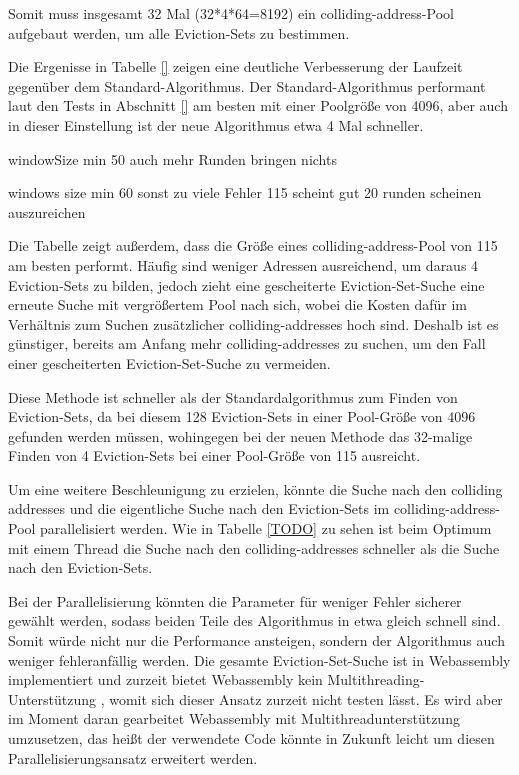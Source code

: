Somit muss insgesamt 32 Mal (32*4*64=8192) ein colliding-address-Pool aufgebaut werden, um alle Eviction-Sets zu bestimmen.



Die Ergenisse in Tabelle \ref{} zeigen eine deutliche Verbesserung der Laufzeit gegenüber dem Standard-Algorithmus.
Der Standard-Algorithmus performant laut den Tests in Abschnitt \ref{} am besten mit einer Poolgröße von 4096, aber auch in dieser Einstellung ist der neue Algorithmus etwa 4 Mal schneller. 

windowSize min 50 auch mehr Runden bringen nichts

windows size min 60 sonst zu viele Fehler
115 scheint gut
20 runden scheinen auszureichen

Die Tabelle zeigt außerdem, dass die Größe eines colliding-address-Pool von 115 am besten performt.
Häufig sind weniger Adressen ausreichend, um daraus 4 Eviction-Sets zu bilden, jedoch zieht eine gescheiterte Eviction-Set-Suche eine erneute Suche mit vergrößertem Pool nach sich, wobei die Kosten dafür im Verhältnis zum Suchen zusätzlicher colliding-addresses hoch sind.
Deshalb ist es günstiger, bereits am Anfang mehr colliding-addresses zu suchen, um den Fall einer gescheiterten Eviction-Set-Suche zu vermeiden.


Diese Methode ist schneller als der Standardalgorithmus zum Finden von Eviction-Sets, da bei diesem 128 Eviction-Sets in einer Pool-Größe von 4096 gefunden werden müssen, wohingegen bei der neuen Methode das 32-malige Finden von 4 Eviction-Sets bei einer Pool-Größe von 115 ausreicht.

Um eine weitere Beschleunigung zu erzielen, könnte die Suche nach den colliding addresses und die eigentliche Suche nach den Eviction-Sets im colliding-address-Pool parallelisiert werden. Wie in Tabelle \ref{TODO} zu sehen ist beim Optimum mit einem Thread die Suche nach den colliding-addresses schneller als die Suche nach den Eviction-Sets.

Bei der Parallelisierung könnten die Parameter für weniger Fehler sicherer gewählt werden, sodass beiden Teile des Algorithmus in etwa gleich schnell sind.
Somit würde nicht nur die Performance ansteigen, sondern der Algorithmus auch weniger fehleranfällig werden.
Die gesamte Eviction-Set-Suche ist in Webassembly implementiert und zurzeit bietet Webassembly kein Multithreading-Unterstützung \cite{WebassemblyThreads}, womit sich dieser Ansatz zurzeit nicht testen lässt.
Es wird aber im Moment daran gearbeitet Webassembly mit Multithreadunterstützung umzusetzen, das heißt der verwendete Code könnte in Zukunft leicht um diesen Parallelisierungsansatz erweitert werden.


